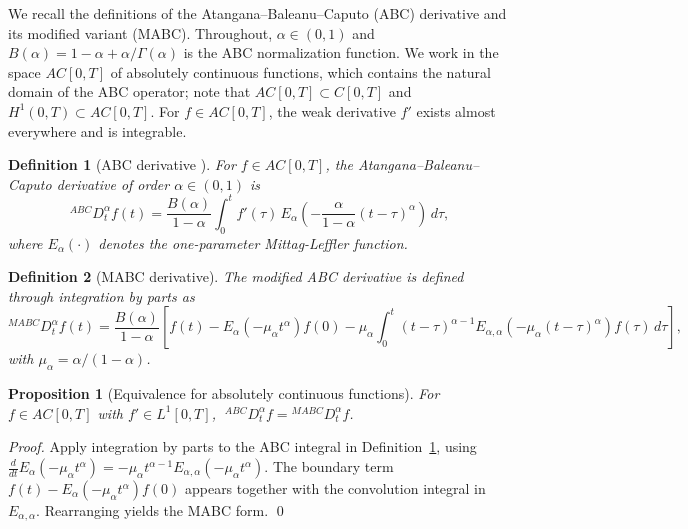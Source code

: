 \documentclass[11pt]{article}
\newtheorem{proposition}{Proposition}
\newtheorem{definition}{Definition}
\begin{document}
We recall the definitions of the Atangana--Baleanu--Caputo (ABC) derivative and its modified variant (MABC). Throughout, \(\alpha \in (0,1)\) and \(B(\alpha) = 1-\alpha+\alpha/\Gamma(\alpha)\) is the ABC normalization function. We work in the space \(AC[0,T]\) of absolutely continuous functions, which contains the natural domain of the ABC operator; note that \(AC[0,T] \subset C[0,T]\) and \(H^1(0,T) \subset AC[0,T]\). For \(f \in AC[0,T]\), the weak derivative \(f'\) exists almost everywhere and is integrable.

\begin{definition}[ABC derivative \cite{Atangana2016}]
\label{def:abc}
For \(f \in AC[0,T]\), the Atangana--Baleanu--Caputo derivative of order \(\alpha \in (0,1)\) is
\begin{equation}
{}^{ABC}D_t^\alpha f(t)
=
\frac{B(\alpha)}{1-\alpha}
\int_0^t
f'(\tau)\,
E_\alpha\!\left(-\frac{\alpha}{1-\alpha}(t-\tau)^\alpha\right)
\,d\tau,
\end{equation}
where \(E_\alpha(\cdot)\) denotes the one-parameter Mittag-Leffler function.
\end{definition}

\begin{definition}[MABC derivative]
\label{def:mabc}
The modified ABC derivative is defined through integration by parts as
\begin{equation}
{}^{MABC}D_t^\alpha f(t)
=
\frac{B(\alpha)}{1-\alpha}
\!\left[
f(t) - E_\alpha(-\mu_\alpha t^\alpha) f(0)
- \mu_\alpha \!\int_0^t\! (t-\tau)^{\alpha-1} E_{\alpha,\alpha}(-\mu_\alpha(t-\tau)^\alpha) f(\tau)\,d\tau
\right],
\end{equation}
with \(\mu_\alpha = \alpha/(1-\alpha)\).
\end{definition}

\begin{proposition}[Equivalence for absolutely continuous functions]
\label{prop:equiv}
For \(f \in AC[0,T]\) with \(f' \in L^1[0,T]\), \(\;{}^{ABC}D_t^\alpha f = {}^{MABC}D_t^\alpha f\).
\end{proposition}

\begin{proof}
Apply integration by parts to the ABC integral in Definition~\ref{def:abc}, using
\(\frac{d}{dt}E_\alpha(-\mu_\alpha t^\alpha) = -\mu_\alpha t^{\alpha-1} E_{\alpha,\alpha}(-\mu_\alpha t^\alpha)\).
The boundary term \(f(t) - E_\alpha(-\mu_\alpha t^\alpha) f(0)\) appears together with the convolution integral in \(E_{\alpha,\alpha}\). Rearranging yields the MABC form. \qed
\end{proof}
\end{document}
